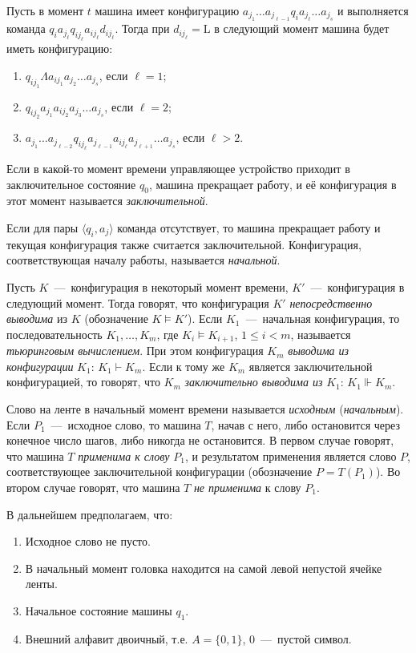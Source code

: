 Пусть в момент $t$ машина имеет конфигурацию $a_{j_1}\dots a_{j_{\ell - 1}}q_ia_{j_\ell}\dots a_{j_s}$ и выполняется команда $q_ia_{j_\ell}q_{ij_\ell}a_{ij_\ell}d_{ij_\ell}$. Тогда при $d_{ij_\ell} = \text{L}$ в следующий момент машина будет иметь конфигурацию:
\begin{enumerate}
    \item $q_{ij_1}\Lambda a_{ij_1}a_{j_2}\dots a_{j_s}$, если $\ell = 1$;
    \item $q_{ij_2}a_{j_1}a_{ij_2}a_{j_3}\dots a_{j_s}$, если $\ell = 2$;
    \item $a_{j_1}\dots a_{j_{\ell - 2}}q_{ij_\ell}a_{j_{\ell - 1}}a_{ij_\ell}a_{j_{\ell + 1}}\dots a_{j_s}$, если $\ell > 2$.
\end{enumerate}
Если в какой-то момент времени управляющее устройство приходит в заключительное состояние $q_0$, машина прекращает работу, и её конфигурация в этот момент называется \textit{заключительной}.

Если для пары $\langle q_i, a_j\rangle$ команда отсутствует, то машина прекращает работу и текущая конфигурация также считается заключительной. Конфигурация, соответствующая началу работы, называется \textit{начальной}.

Пусть $K$~---~конфигурация в некоторый момент времени, $K'$~---~конфигурация в следующий момент. Тогда говорят, что конфигурация $K'$ \textit{непосредственно выводима} из $K$ (обозначение $K \models K'$). Если $K_1$~---~начальная конфигурация, то последовательность $K_1, \dots, K_m$, где $K_i \models K_{i + 1}$, $1 \leqslant i < m$, называется \textit{тьюринговым вычислением}. При этом конфигурация $K_m$ \textit{выводима из конфигурации} $K_1$: $K_1 \vdash K_m$. Если к тому же $K_m$ является заключительной конфигурацией, то говорят, что $K_m$ \textit{заключительно выводима из} $K_1$: $K_1 \Vdash K_m$.

Слово на ленте в начальный момент времени называется \textit{исходным} (\textit{начальным}). Если $P_1$~---~исходное слово, то машина $T$, начав с него, либо остановится через конечное число шагов, либо никогда не остановится. В первом случае говорят, что машина $T$ \textit{применима к слову} $P_1$, и результатом применения является слово $P$, соответствующее заключительной конфигурации (обозначение $P = T(P_1)$). Во втором случае говорят, что машина $T$ \textit{не применима} к слову $P_1$.

В дальнейшем предполагаем, что:
\begin{enumerate}
    \item Исходное слово не пусто.
    \item В начальный момент головка находится на самой левой непустой ячейке ленты.
    \item Начальное состояние машины $q_1$.
    \item Внешний алфавит двоичный, т.е. $A = \{0, 1\}$, $0$~---~пустой символ. 
\end{enumerate}

